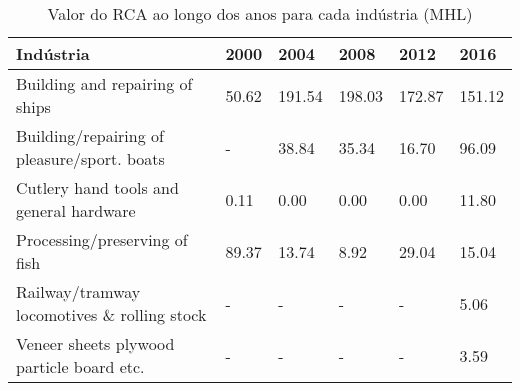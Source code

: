 \begin{table}
\centering
\caption{Valor do RCA ao longo dos anos para cada indústria (MHL)}
\label{tab:ex3-tempo-MHL}
\begin{tabular}{p{6cm}p{1.5cm}p{1.5cm}p{1.5cm}p{1.5cm}p{1.5cm}}
\toprule
                                  Indústria &  2000 &   2004 &   2008 &   2012 &   2016 \\
\midrule
            Building and repairing of ships & 50.62 & 191.54 & 198.03 & 172.87 & 151.12 \\
Building/repairing of pleasure/sport. boats &     - &  38.84 &  35.34 &  16.70 &  96.09 \\
    Cutlery hand tools and general hardware &  0.11 &   0.00 &   0.00 &   0.00 &  11.80 \\
              Processing/preserving of fish & 89.37 &  13.74 &   8.92 &  29.04 &  15.04 \\
Railway/tramway locomotives \& rolling stock &     - &      - &      - &      - &   5.06 \\
  Veneer sheets plywood particle board etc. &     - &      - &      - &      - &   3.59 \\
\bottomrule
\end{tabular}
\end{table}
